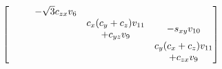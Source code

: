 \documentclass[twocolumn,showpacs,preprintnumbers,superscriptaddress,prb,floatfix,aps,10pt]{revtex4-1}
\begin{document}
\begin{widetext}
\begin{equation}
\begin{bmatrix}
                                                            &                                           &                 -\sqrt{3} c_{zx} v_{6}          &                                          &                                    \\
\multirow{2}{*}{ }                                          & \multirow{2}{*}{ }                        & \multirow{2}{*}{ }                              &      c_{x} (c_{y}+c_{z}) v_{11}          & \multirow{2}{*}{$-s_{xy} v_{10}$}  \\
                                                            &                                           &                                                 &                  +c_{yz} v_{9}           &                                    \\
\multirow{2}{*}{ }                                          & \multirow{2}{*}{ }                        & \multirow{2}{*}{ }                              & \multirow{2}{*}{ }                       &      c_{y} (c_{x}+c_{z}) v_{11}    \\
                                                            &                                           &                                                 &                                          &                  +c_{zx} v_{9}     \\
\end{bmatrix}
\end{equation}
\end{widetext}


%
%
%
\end{document}

